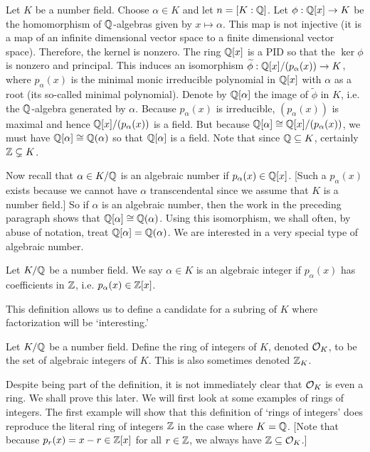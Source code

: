 Let $K$ be a number field. Choose $\alpha \in K$ and let $n=[K:\mathbb{Q}]$. Let $\phi: \mathbb{Q}[x] \to K$ be the homomorphism of $\mathbb{Q}$-algebras given by $x \mapsto \alpha$. This map is not injective (it is a map of an infinite dimensional vector space to a finite dimensional vector space). Therefore, the kernel is nonzero. The ring $\mathbb{Q}[x]$ is a PID so that the $\ker \phi$ is nonzero and principal. This induces an isomorphism $\widetilde{\phi}: \mathbb{Q}[x]/(p_\alpha(x)) \to K$, where $p_\alpha(x)$ is the minimal monic irreducible polynomial in $\mathbb{Q}[x]$ with $\alpha$ as a root (its so-called minimal polynomial). Denote by $\mathbb{Q}[\alpha]$ the image of $\widetilde{\phi}$ in $K$, i.e. the $\mathbb{Q}$-algebra generated by $\alpha$. Because $p_\alpha(x)$ is irreducible, $(p_\alpha(x))$ is maximal and hence $\mathbb{Q}[x]/(p_\alpha(x))$ is a field. But because $\mathbb{Q}[\alpha] \cong \mathbb{Q}[x]/(p_\alpha(x))$, we must have $\mathbb{Q}[\alpha] \cong \mathbb{Q}(\alpha)$ so that $\mathbb{Q}[\alpha]$ is a field. Note that since $\mathbb{Q} \subseteq K$, certainly $\mathbb{Z} \subsetneq K$. 


Now recall that $\alpha \in K/\mathbb{Q}$ is an algebraic number if $p_\alpha(x) \in \mathbb{Q}[x]$. [Such a $p_\alpha(x)$ exists because we cannot have $\alpha$ transcendental since we assume that $K$ is a number field.] So if $\alpha$ is an algebraic number, then the work in the preceding paragraph shows that $\mathbb{Q}[\alpha] \cong \mathbb{Q}(\alpha)$. Using this isomorphism, we shall often, by abuse of notation, treat $\mathbb{Q}[\alpha] = \mathbb{Q}(\alpha)$. We are interested in a very special type of algebraic number. 


\begin{dfn}
Let $K/\mathbb{Q}$ be a number field. We say $\alpha \in K$ is an algebraic integer if $p_\alpha(x)$ has coefficients in $\mathbb{Z}$, i.e. $p_\alpha(x) \in \mathbb{Z}[x]$. 
\end{dfn}


This definition allows us to define a candidate for a subring of $K$ where factorization will be `interesting.' 


\begin{dfn}
Let $K/\mathbb{Q}$ be a number field. Define the ring of integers of  $K$, denoted $\mathcal{O}_K$, to be the set of algebraic integers of $K$. This is also sometimes denoted $\mathbb{Z}_K$. 
\end{dfn}


Despite being part of the definition, it is not immediately clear that $\mathcal{O}_K$ is even a ring. We shall prove this later. We will first look at some examples of rings of integers. The first example will show that this definition of `rings of integers' does reproduce the literal ring of integers $\mathbb{Z}$ in the case where $K= \mathbb{Q}$. [Note that because $p_r(x)= x - r \in \mathbb{Z}[x]$ for all $r \in \mathbb{Z}$, we always have $\mathbb{Z} \subseteq \mathcal{O}_K$.]


